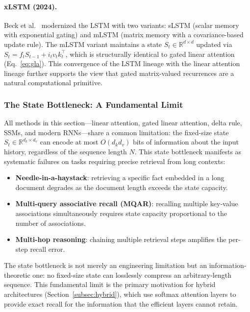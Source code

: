 \paragraph{xLSTM (2024).}
Beck et al.~\cite{beck2024xlstm} modernized the LSTM with two variants: sLSTM (scalar memory with exponential gating) and mLSTM (matrix memory with a covariance-based update rule). The mLSTM variant maintains a state $S_t \in \mathbb{R}^{d \times d}$ updated via $S_t = f_t S_{t-1} + i_t v_t k_t^\top$, which is structurally identical to gated linear attention (Eq.~\ref{eq:gla}). This convergence of the LSTM lineage with the linear attention lineage further supports the view that gated matrix-valued recurrences are a natural computational primitive.

\subsubsection{The State Bottleneck: A Fundamental Limit}

All methods in this section---linear attention, gated linear attention, delta rule, SSMs, and modern RNNs---share a common limitation: the fixed-size state $S_t \in \mathbb{R}^{d_k \times d_v}$ can encode at most $O(d_k d_v)$ bits of information about the input history, regardless of the sequence length $N$. This state bottleneck manifests as systematic failures on tasks requiring precise retrieval from long contexts:
\begin{itemize}[nosep]
\item \textbf{Needle-in-a-haystack}: retrieving a specific fact embedded in a long document degrades as the document length exceeds the state capacity.
\item \textbf{Multi-query associative recall (MQAR)}: recalling multiple key-value associations simultaneously requires state capacity proportional to the number of associations.
\item \textbf{Multi-hop reasoning}: chaining multiple retrieval steps amplifies the per-step recall error.
\end{itemize}
The state bottleneck is not merely an engineering limitation but an information-theoretic one: no fixed-size state can losslessly compress an arbitrary-length sequence. This fundamental limit is the primary motivation for hybrid architectures (Section~\ref{subsec:hybrid}), which use softmax attention layers to provide exact recall for the information that the efficient layers cannot retain.



